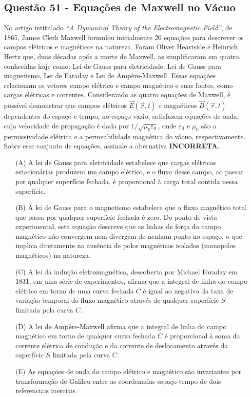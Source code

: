 \documentclass[a4paper,12pt]{article}
\begin{document}
\begin{flushleft}
\subsection{Questão 51 - Equações de Maxwell no Vácuo}
No artigo intitulado \textit{``A Dynamical Theory of the Electromagnetic Field''}, de 1865, James Clerk Maxwell formulou inicialmente 20 
equações para descrever os campos elétricos e magnéticos na natureza. Foram Oliver Heaviside e Heinrich Hertz que, duas décadas após a morte 
de Maxwell, as simplificaram em quatro, conhecidas hoje como: Lei de Gauss para eletricidade, Lei de Gauss para magnetismo, Lei de Faraday e Lei de 
Ampère-Maxwell. Essas equações relacionam os vetores campo elétrico e campo magnético e suas fontes, como cargas elétricas e correntes. Considerando 
as quatro equações de Maxwell, é possível demonstrar que campos elétricos \(\vec{E}(\vec{r},t)\) e magnéticos \(\vec{B}(\vec{r},t)\) dependentes do 
espaço e tempo, no espaço vazio, satisfazem equações de onda, cuja velocidade de propagação é dada por \(1/\sqrt{\mu_0\varepsilon_0}\), 
onde \(\varepsilon_0\) e \(\mu_0\) são a permissividade elétrica e a permeabilidade magnética do vácuo, respectivamente. 
Sobre esse conjunto de equações, assinale a alternativa \colorbox{red!20}{\textbf{INCORRETA}.}

\begin{itemize}
\item[(A)] A lei de Gauss para eletricidade estabelece que cargas elétricas estacionárias produzem um campo elétrico, e o fluxo desse campo, ao passar por qualquer superfície fechada, é proporcional à carga total contida nessa superfície.
\item[(B)] A lei de Gauss para o magnetismo estabelece que o fluxo magnético total que passa por qualquer superfície fechada é zero. Do ponto de vista experimental, esta equação descreve que as linhas de força do campo magnético não convergem nem divergem de nenhum ponto no espaço, o que implica diretamente na ausência de polos magnéticos isolados (monopolos magnéticos) na natureza.
\item[(C)] A lei da indução eletromagnética, descoberta por Michael Faraday em 1831, em uma série de experimentos, afirma que a integral de linha do campo elétrico em torno de uma curva fechada \(C\) é igual ao negativo da taxa de variação temporal do fluxo magnético através de qualquer superfície \(S\) limitada pela curva \(C\).
\item[(D)] A lei de Ampère-Maxwell afirma que a integral de linha do campo magnético em torno de qualquer curva fechada \(C\) é proporcional à soma da corrente elétrica de condução e da corrente de deslocamento através da superfície \(S\) limitada pela curva \(C\).
\item[(E)] As equações de onda do campo elétrico e magnético são invariantes por transformação de Galileu entre as coordenadas espaço-tempo de dois referenciais inerciais.
\end{itemize}


\end{flushleft}
\end{document}
